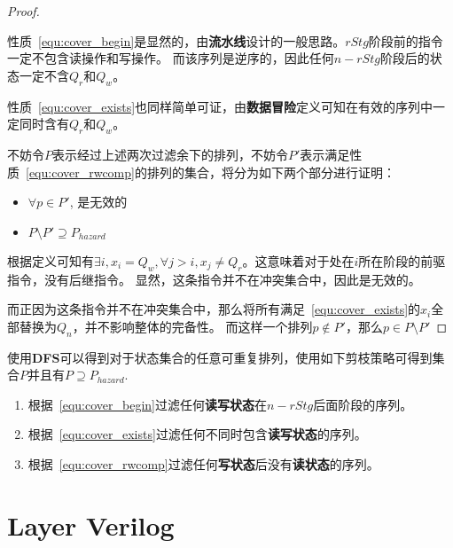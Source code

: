 \documentclass[hyperref,UTF8]{ctexart}
\theoremstyle{definition}
\theoremstyle{remark}
\numberwithin{equation}{subsection}
\newcommand{\Emph}{\textbf}
\begin{document}
	\begin{proof}
	\label{proof:valid_perm_property}
		
		性质~\ref{equ:cover_begin}是显然的，由\Emph{流水线}设计的一般思路。$rStg$阶段前的指令一定不包含读操作和写操作。
		而该序列是逆序的，因此任何$n-rStg$阶段后的状态一定不含$Q_r$和$Q_w$。
		
		性质~\ref{equ:cover_exists}也同样简单可证，由\Emph{数据冒险}定义可知在有效的序列中一定同时含有$Q_r$和$Q_w$。
		
		不妨令$P$表示经过上述两次过滤余下的排列，不妨令$P'$表示满足性质~\ref{equ:cover_rwcomp}的排列的集合，将分为如下两个部分进行证明：
		\begin{itemize}
			\item $\forall p \in P'$, 是无效的
			
			\item $P \setminus P' \supseteq P_{hazard}$
		\end{itemize}
		根据定义可知有$\exists i, x_i = Q_w, \forall j>i, x_j \neq Q_r$。这意味着对于处在$i$所在阶段的前驱指令，没有后继指令。
		显然，这条指令并不在冲突集合中，因此是无效的。
		
		而正因为这条指令并不在冲突集合中，那么将所有满足~\ref{equ:cover_exists}的$x_i$全部替换为$Q_n$，并不影响整体的完备性。
		而这样一个排列$p \notin P'$，那么$p \in P \setminus P'$
		
	\end{proof}
	
	
	使用\Emph{DFS}可以得到对于状态集合的任意可重复排列，使用如下剪枝策略可得到集合$P$并且有$P \supseteq P_{hazard}$.
	\begin{enumerate}
	
		\item 根据~\ref{equ:cover_begin}过滤任何\Emph{读写状态}在$n-rStg$后面阶段的序列。
		
		\item 根据~\ref{equ:cover_exists}过滤任何不同时包含\Emph{读写状态}的序列。
		
		\item 根据~\ref{equ:cover_rwcomp}过滤任何\Emph{写状态}后没有\Emph{读状态}的序列。
		
	\end{enumerate}
	
	
	
	
\section{Layer Verilog}
\label{sec:layer_verilog}	
\end{document}
